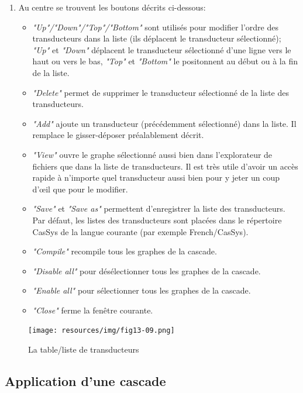 \begin{enumerate}
	 \item Au centre se trouvent les boutons décrits ci-dessous:
		\begin{itemize}
		\item \textit{"Up"/"Down"/"Top"/"Bottom"} sont utilisés pour modifier l'ordre
		des transducteurs dans la liste (ils déplacent le transducteur sélectionné); 
		\textit{"Up"} et \textit{"Down"} déplacent le transducteur sélectionné d'une ligne vers le haut ou
			vers le bas, \textit{"Top"} et \textit{"Bottom"} le positonnent au début ou à la fin de la liste.
		\item \textit{"Delete"} permet de supprimer le transducteur sélectionné de
		la liste des transducteurs. 
		\item \textit{"Add"} ajoute un transducteur (précédemment sélectionné) dans la liste.
			Il remplace le gisser-déposer préalablement décrit.
		\item \textit{"View"} ouvre le graphe sélectionné aussi bien dans l'explorateur
		de fichiers que dans la liste de transducteurs. Il est très utile d'avoir un accès
		rapide à n'importe quel transducteur aussi bien pour y jeter un coup d'œil que pour
		le modifier.
		\item \textit{"Save"} et \textit{"Save as"} permettent d'enregistrer la
		liste des transducteurs. Par défaut, les listes des transducteurs sont placées dans
		le répertoire CasSys de la langue courante  (par exemple French/CasSys).
		\item \textit{"Compile"} recompile tous les graphes de la cascade.	
		\item \textit{"Disable all"} pour désélectionner tous les graphes de la cascade.	
		\item \textit{"Enable all"} pour sélectionner tous les graphes de la cascade.	
		\item \textit{"Close"} ferme la fenêtre courante.
		\end{itemize}
\end{enumerate}


\begin{figure}[!htb]
  \centering
  \texttt{[image: resources/img/fig13-09.png]}
  \caption{La table/liste de transducteurs}
  \label{fig13-09}
\end{figure}

	

\subsection{Application d'une cascade}
\label{subsec:launchCascade}

